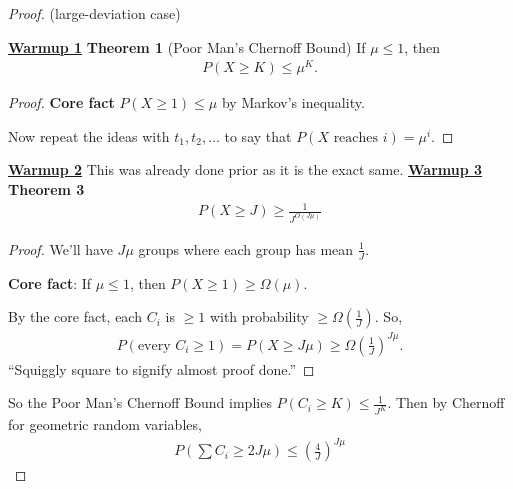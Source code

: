 \documentclass{report}
\begin{document}
\begin{proof}
    (large-deviation case)

    \noindent \underline{\textbf{Warmup 1}}
    \newline \newline
    \noindent \textbf{Theorem 1} (Poor Man's Chernoff Bound)
        If $\mu \leq 1$, then
        \begin{align*}
            P( X \geq K) \leq \mu^K.
        \end{align*}
    \begin{proof}
        \textbf{Core fact} $P(X \geq 1) \leq \mu$ by Markov's inequality. 

        Now repeat the ideas with $t_1, t_2, \ldots$ to say that $P(X \text{ reaches } i) = \mu^i$. 
    \end{proof}
    \newpage
    \noindent \underline{\textbf{Warmup 2}} This was already done prior as it is the exact same.
    \newline \newline
    \noindent \underline{\textbf{Warmup 3}}
    \newline \newline
    \noindent \textbf{Theorem 3}
    \begin{align*}
        P(X \geq J) \geq \frac{1}{J^{O(J\mu)}}
    \end{align*}
    \begin{proof}
        We'll have $J \mu$ groups where each group has mean $\frac 1J$. 

        \noindent \textbf{Core fact}: If $\mu \leq 1$, then $P(X \geq 1) \geq \Omega(\mu)$. 

        By the core fact, each $C_i$ is $\geq 1$ with probability $\geq \Omega \left( \frac 1J\right)$. So, 
        \begin{align*}
            P(\text{every } C_i \geq 1) = P(X \geq J\mu) \geq \Omega \left(\frac 1J\right)^{J \mu}.
        \end{align*}
        ``Squiggly square to signify almost proof done.''
    \end{proof}

    So the Poor Man's Chernoff Bound implies $P(C_i \geq K) \leq \frac{1}{J^K}$. Then by Chernoff for geometric random variables,
    \begin{align*}
        P\left(\sum C_i \geq 2J \mu\right) \leq \left(\frac{4}{J}\right)^{J \mu}
    \end{align*}

\end{proof}
\end{document}
